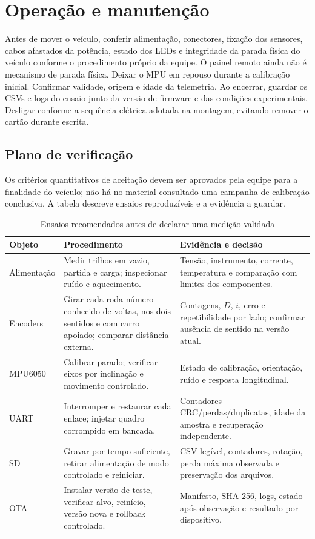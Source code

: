 \section{Operação e manutenção}
Antes de mover o veículo, conferir alimentação, conectores, fixação dos sensores, cabos afastados da potência, estado dos LEDs e integridade da parada física do veículo conforme o procedimento próprio da equipe. O painel remoto ainda não é mecanismo de parada física. Deixar o MPU em repouso durante a calibração inicial. Confirmar validade, origem e idade da telemetria. Ao encerrar, guardar os CSVs e logs do ensaio junto da versão de firmware e das condições experimentais. Desligar conforme a sequência elétrica adotada na montagem, evitando remover o cartão durante escrita.

\subsection{Plano de verificação}
Os critérios quantitativos de aceitação devem ser aprovados pela equipe para a finalidade do veículo; não há no material consultado uma campanha de calibração conclusiva. A tabela descreve ensaios reproduzíveis e a evidência a guardar.
\begin{table}[htbp]\centering\small
\caption{Ensaios recomendados antes de declarar uma medição validada}\label{tab:ensaios}
\begin{tabularx}{\textwidth}{@{}l X X@{}}\toprule
Objeto & Procedimento & Evidência e decisão\\\midrule
Alimentação & Medir trilhos em vazio, partida e carga; inspecionar ruído e aquecimento. & Tensão, instrumento, corrente, temperatura e comparação com limites dos componentes.\\
Encoders & Girar cada roda número conhecido de voltas, nos dois sentidos e com carro apoiado; comparar distância externa. & Contagens, $D$, $i$, erro e repetibilidade por lado; confirmar ausência de sentido na versão atual.\\
MPU6050 & Calibrar parado; verificar eixos por inclinação e movimento controlado. & Estado de calibração, orientação, ruído e resposta longitudinal.\\
UART & Interromper e restaurar cada enlace; injetar quadro corrompido em bancada. & Contadores CRC/perdas/duplicatas, idade da amostra e recuperação independente.\\
SD & Gravar por tempo suficiente, retirar alimentação de modo controlado e reiniciar. & CSV legível, contadores, rotação, perda máxima observada e preservação dos arquivos.\\
OTA & Instalar versão de teste, verificar alvo, reinício, versão nova e rollback controlado. & Manifesto, SHA-256, logs, estado após observação e resultado por dispositivo.\\\bottomrule
\end{tabularx}\end{table}

